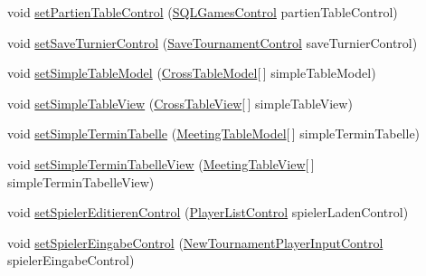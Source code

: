 \begin{DoxyCompactItemize}
\item 
void \hyperlink{classde_1_1turnierverwaltung_1_1control_1_1_main_control_aa5a3f63eb2ca55aaa8ad4309c7d660a2}{set\+Partien\+Table\+Control} (\hyperlink{classde_1_1turnierverwaltung_1_1control_1_1_s_q_l_games_control}{S\+Q\+L\+Games\+Control} partien\+Table\+Control)
\item 
void \hyperlink{classde_1_1turnierverwaltung_1_1control_1_1_main_control_a223bf677e84443be9201018c22652fbb}{set\+Save\+Turnier\+Control} (\hyperlink{classde_1_1turnierverwaltung_1_1control_1_1_save_tournament_control}{Save\+Tournament\+Control} save\+Turnier\+Control)
\item 
void \hyperlink{classde_1_1turnierverwaltung_1_1control_1_1_main_control_aa708c25a51dbf9727254de5f22faf6cf}{set\+Simple\+Table\+Model} (\hyperlink{classde_1_1turnierverwaltung_1_1model_1_1_cross_table_model}{Cross\+Table\+Model}\mbox{[}$\,$\mbox{]} simple\+Table\+Model)
\item 
void \hyperlink{classde_1_1turnierverwaltung_1_1control_1_1_main_control_a4592763527cab8f25044b39fcfe1bec6}{set\+Simple\+Table\+View} (\hyperlink{classde_1_1turnierverwaltung_1_1view_1_1_cross_table_view}{Cross\+Table\+View}\mbox{[}$\,$\mbox{]} simple\+Table\+View)
\item 
void \hyperlink{classde_1_1turnierverwaltung_1_1control_1_1_main_control_a1f506ffb8740fb26682fa1398aad8f35}{set\+Simple\+Termin\+Tabelle} (\hyperlink{classde_1_1turnierverwaltung_1_1model_1_1_meeting_table_model}{Meeting\+Table\+Model}\mbox{[}$\,$\mbox{]} simple\+Termin\+Tabelle)
\item 
void \hyperlink{classde_1_1turnierverwaltung_1_1control_1_1_main_control_a94319616051f3bedef822f8eb9db6917}{set\+Simple\+Termin\+Tabelle\+View} (\hyperlink{classde_1_1turnierverwaltung_1_1view_1_1_meeting_table_view}{Meeting\+Table\+View}\mbox{[}$\,$\mbox{]} simple\+Termin\+Tabelle\+View)
\item 
void \hyperlink{classde_1_1turnierverwaltung_1_1control_1_1_main_control_a5300bc2e10d1ae81abc6bdd995c22aa6}{set\+Spieler\+Editieren\+Control} (\hyperlink{classde_1_1turnierverwaltung_1_1control_1_1_player_list_control}{Player\+List\+Control} spieler\+Laden\+Control)
\item 
void \hyperlink{classde_1_1turnierverwaltung_1_1control_1_1_main_control_a915d14e53f5825870d7b07ddf9d9e217}{set\+Spieler\+Eingabe\+Control} (\hyperlink{classde_1_1turnierverwaltung_1_1control_1_1_new_tournament_player_input_control}{New\+Tournament\+Player\+Input\+Control} spieler\+Eingabe\+Control)
\item 

\end{DoxyCompactItemize}
